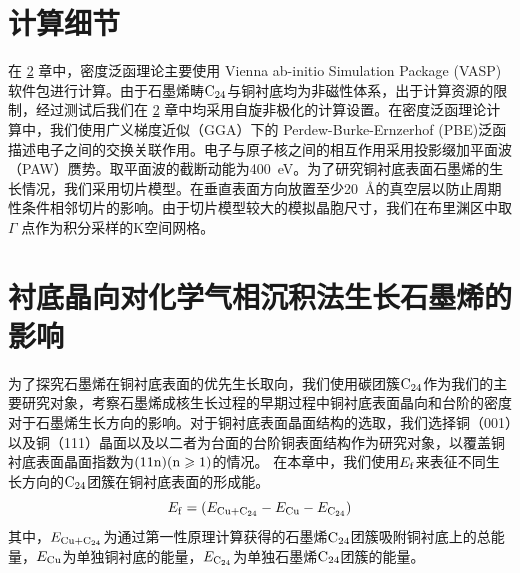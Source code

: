 \section{计算细节}
    在 \ref{sec:石墨烯优先生长取向} 章中，密度泛函理论主要使用 Vienna ab-initio Simulation Package (VASP) 软件包进行计算。由于石墨烯畴$\rm{C_{24}}$与铜衬底均为非磁性体系，出于计算资源的限制，经过测试后我们在 \ref{sec:石墨烯优先生长取向} 章中均采用自旋非极化的计算设置。在密度泛函理论计算中，我们使用广义梯度近似（GGA）下的 Perdew-Burke-Ernzerhof (PBE)泛函描述电子之间的交换关联作用。电子与原子核之间的相互作用采用投影缀加平面波（PAW）赝势。取平面波的截断动能为\SI{400}{\electronvolt}。为了研究铜衬底表面石墨烯的生长情况，我们采用切片模型。在垂直表面方向放置至少\SI{20}{\angstrom}的真空层以防止周期性条件相邻切片的影响。由于切片模型较大的模拟晶胞尺寸，我们在布里渊区中取 $\Gamma$ 点作为积分采样的K空间网格。
\section{衬底晶向对化学气相沉积法生长石墨烯的影响}
\label{sec:石墨烯优先生长取向}
\def\CCluster#1{\rm{C_{#1}}}
    为了探究石墨烯在铜衬底表面的优先生长取向，我们使用碳团簇$\CCluster{24}$作为我们的主要研究对象，考察石墨烯成核生长过程的早期过程中铜衬底表面晶向和台阶的密度对于石墨烯生长方向的影响。对于铜衬底表面晶面结构的选取，我们选择铜（001）以及铜（111）晶面以及以二者为台面的台阶铜表面结构作为研究对象，以覆盖铜衬底表面晶面指数为$\rm{(11n)(n \geqslant 1)}$的情况。
    在本章中，我们使用$E_{\rm{f}}$来表征不同生长方向的$\CCluster{24}$团簇在铜衬底表面的形成能。
    \begin{equation}
        E_{\rm{f}}=
    (E_{\rm{Cu+\CCluster{24}}}-E_{\rm{Cu}}-E_{\rm{\CCluster{24}}})
    \end{equation}
    其中，$E_{\rm{Cu+\CCluster{24}}}$为通过第一性原理计算获得的石墨烯$\CCluster{24}$团簇吸附铜衬底上的总能量，$E_{\rm{Cu}}$为单独铜衬底的能量，$E_{\rm{\CCluster{24}}}$为单独石墨烯$\CCluster{24}$团簇的能量。
    
